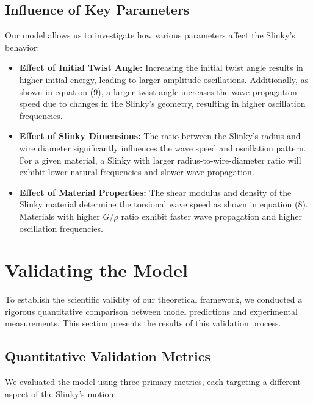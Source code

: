\documentclass{mcmthesis}  %
\begin{document}
\subsection{Influence of Key Parameters}
Our model allows us to investigate how various parameters affect the Slinky's behavior:

\begin{itemize}
    \item \textbf{Effect of Initial Twist Angle:} Increasing the initial twist angle results in higher initial energy, leading to larger amplitude oscillations. Additionally, as shown in equation (9), a larger twist angle increases the wave propagation speed due to changes in the Slinky's geometry, resulting in higher oscillation frequencies.
    
    \item \textbf{Effect of Slinky Dimensions:} The ratio between the Slinky's radius and wire diameter significantly influences the wave speed and oscillation pattern. For a given material, a Slinky with larger radius-to-wire-diameter ratio will exhibit lower natural frequencies and slower wave propagation.
    
    \item \textbf{Effect of Material Properties:} The shear modulus and density of the Slinky material determine the torsional wave speed as shown in equation (8). Materials with higher $G/\rho$ ratio exhibit faster wave propagation and higher oscillation frequencies.
\end{itemize}

\section{Validating the Model}  %

To establish the scientific validity of our theoretical framework, we conducted a rigorous quantitative comparison between model predictions and experimental measurements. This section presents the results of this validation process.

\subsection{Quantitative Validation Metrics}
We evaluated the model using three primary metrics, each targeting a different aspect of the Slinky's motion:
\end{document}
